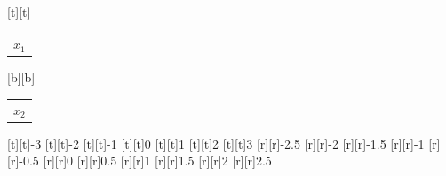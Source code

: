 %    
%
%
\begin{psfrags}%
\psfragscanon%
%
[t][t]{\setlength{\tabcolsep}{0pt}\begin{tabular}{c}$x_1$\end{tabular}}%
[b][b]{\setlength{\tabcolsep}{0pt}\begin{tabular}{c}$x_2$\end{tabular}}%
%
[t][t]{-3}%
[t][t]{-2}%
[t][t]{-1}%
[t][t]{0}%
[t][t]{1}%
[t][t]{2}%
[t][t]{3}%
%
[r][r]{-2.5}%
[r][r]{-2}%
[r][r]{-1.5}%
[r][r]{-1}%
[r][r]{-0.5}%
[r][r]{0}%
[r][r]{0.5}%
[r][r]{1}%
[r][r]{1.5}%
[r][r]{2}%
[r][r]{2.5}%
%
%
\end{psfrags}%
%

